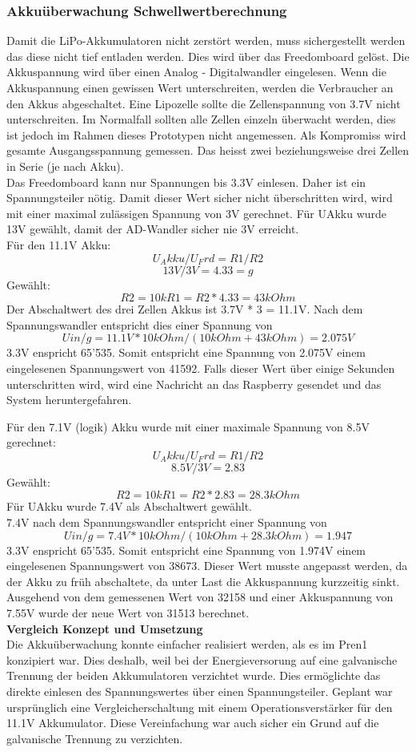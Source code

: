 \subsubsection{Akkuüberwachung Schwellwertberechnung}
Damit die LiPo-Akkumulatoren nicht zerstört werden, muss sichergestellt werden das diese nicht tief entladen werden. Dies wird über das Freedomboard gelöst. Die Akkuspannung wird über einen Analog - Digitalwandler eingelesen. Wenn die Akkuspannung einen gewissen Wert unterschreiten, werden die Verbraucher an den Akkus abgeschaltet. Eine Lipozelle sollte die Zellenspannung von 3.7V nicht unterschreiten. Im Normalfall sollten alle Zellen einzeln überwacht werden, dies ist jedoch im Rahmen dieses Prototypen nicht angemessen. Als Kompromiss wird gesamte Ausgangsspannung gemessen. Das heisst zwei beziehungsweise drei Zellen in Serie (je nach Akku).\\
Das Freedomboard kann nur Spannungen bis 3.3V einlesen. Daher ist ein Spannungsteiler nötig. Damit dieser Wert sicher nicht überschritten wird, wird mit einer maximal zulässigen Spannung von 3V gerechnet. Für UAkku wurde 13V gewählt, damit der AD-Wandler sicher nie 3V erreicht.\\
Für den 11.1V Akku:
\[	U_Akku/U_Frd=R1/R2\]
\[	13V/3V=4.33=g\]
Gewählt:
\[	R2=10k R1=R2*4.33=43kOhm\]
Der Abschaltwert des drei Zellen Akkus ist 3.7V * 3 = 11.1V.
Nach dem Spannungswandler entspricht dies einer Spannung von \[Uin/g=11.1V*10kOhm/(10kOhm+43kOhm)=2.075V\]
3.3V enspricht 65'535. Somit entspricht eine Spannung von 2.075V einem eingelesenen Spannungswert von 41592. Falls dieser Wert über einige Sekunden unterschritten wird, wird eine Nachricht an das Raspberry gesendet und das System heruntergefahren.

Für den 7.1V (logik) Akku wurde mit einer maximale Spannung von 8.5V gerechnet:
\[	U_Akku/U_Frd=R1/R2\]
\[	8.5V/3V=2.83\]
Gewählt:
\[	R2=10k R1=R2*2.83=28.3kOhm\]
Für UAkku wurde 7.4V als Abschaltwert gewählt.\\
7.4V nach dem Spannungswandler entspricht einer Spannung von \[Uin/g=7.4V*10kOhm/(10kOhm + 28.3kOhm)=1.947\]
3.3V enspricht 65'535. Somit entspricht eine Spannung von 1.974V einem eingelesenen Spannungswert von 38673. Dieser Wert musste angepasst werden, da der Akku zu früh abschaltete, da unter Last die Akkuspannung kurzzeitig sinkt. Ausgehend von dem gemessenen Wert von 32158 und einer Akkuspannung von 7.55V wurde der neue Wert von 31513 berechnet.
\\[0.2cm]
\textbf{Vergleich Konzept und Umsetzung}\\[0.2cm]
Die Akkuüberwachung konnte einfacher realisiert werden, als es im Pren1 konzipiert war. Dies deshalb, weil bei der Energieversorung auf eine galvanische Trennung der beiden Akkumulatoren verzichtet wurde. Dies ermöglichte das direkte einlesen des Spannungswertes über einen Spannungsteiler. Geplant war ursprünglich eine Vergleicherschaltung mit einem Operationsverstärker für den 11.1V Akkumulator. Diese Vereinfachung war auch sicher ein Grund auf die galvanische Trennung zu verzichten.
